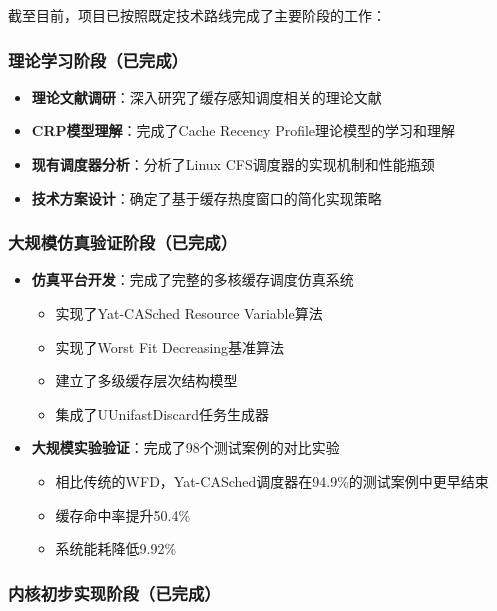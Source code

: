 截至目前，项目已按照既定技术路线完成了主要阶段的工作：

\subsubsection{理论学习阶段（已完成）}

\begin{itemize}
    \item \textbf{理论文献调研}：深入研究了缓存感知调度相关的理论文献
    \item \textbf{CRP模型理解}：完成了Cache Recency Profile理论模型的学习和理解
    \item \textbf{现有调度器分析}：分析了Linux CFS调度器的实现机制和性能瓶颈
    \item \textbf{技术方案设计}：确定了基于缓存热度窗口的简化实现策略
\end{itemize}

\subsubsection{大规模仿真验证阶段（已完成）}

\begin{itemize}
    \item \textbf{仿真平台开发}：完成了完整的多核缓存调度仿真系统
    \begin{itemize}
        \item 实现了Yat-CASched Resource Variable算法
        \item 实现了Worst Fit Decreasing基准算法
        \item 建立了多级缓存层次结构模型
        \item 集成了UUnifastDiscard任务生成器
    \end{itemize}
    \item \textbf{大规模实验验证}：完成了98个测试案例的对比实验
    \begin{itemize}
        \item 相比传统的WFD，Yat-CASched调度器在94.9\%的测试案例中更早结束
        \item 缓存命中率提升50.4\%
        \item 系统能耗降低9.92\%
    \end{itemize}
    
\end{itemize}

\subsubsection{内核初步实现阶段（已完成）}


